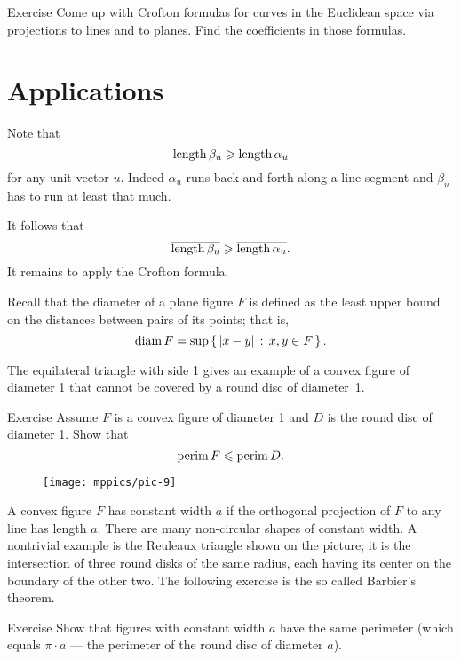 \begin{thm}{Exercise}\label{ex:3d-crofton}
Come up with Crofton formulas for curves in the Euclidean space via projections to lines and to planes.
Find the coefficients in those formulas.
\end{thm}

\section{Applications}

Note that 
\[\mathop{\rm length}\nolimits \beta_u\geqslant \mathop{\rm length}\nolimits \alpha_u\]
for any unit vector $u$.
Indeed $\alpha_u$ runs back and forth along a line segment and $\beta_u$ has to run at least that much.

It follows that 
\[\overline{\mathop{\rm length}\nolimits \beta_u}\geqslant \overline{\mathop{\rm length}\nolimits \alpha_u}.\]
It remains to apply the Crofton formula.
\qeds


Recall that the diameter of a plane figure $F$ is defined as the least upper bound on the distances between pairs of its points;
that is,
\[\mathop{\rm diam}\nolimits F=\sup\left\{\,{|x-y|}\,:\,{x,y\in F}\,\right\}.\]

The equilateral triangle with side 1 gives an example of a convex figure of diameter 1 that cannot be covered by a round disc of diameter~1.

\begin{thm}{Exercise} 
Assume $F$ is a convex figure of diameter 1 and $D$ is the round disc of diameter 1.
Show that
\[\mathop{\rm perim}\nolimits F\leqslant \mathop{\rm perim}\nolimits D.\]
\end{thm}

\begin{wrapfigure}{r}{33 mm}
\vskip-5mm
\centering
\texttt{[image: mppics/pic-9]}
\end{wrapfigure}

A convex figure $F$ has constant width $a$ if the orthogonal projection of $F$ to any line has length $a$.
There are many non-circular shapes of constant width. 
A nontrivial example is the Reuleaux triangle shown on the picture;
it is the intersection of three round disks of the same radius, each having its center on the boundary of the other two.
The following exercise is the so called Barbier's theorem.

\begin{thm}{Exercise} 
Show that figures with constant width $a$ have the same perimeter (which equals $\pi\cdot a$ --- the perimeter of the round disc of diameter $a$).
\end{thm}

